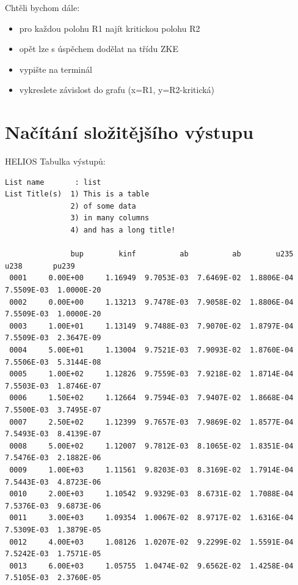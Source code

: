 \documentclass{beamer}
\begin{document}
\begin{frame}
  Chtěli bychom dále:
  \begin{itemize}
    \item pro každou polohu R1 najít kritickou polohu R2
    \item opět lze s úspěchem dodělat na třídu ZKE
    \item vypište na terminál
    \item vykreslete závislost do grafu (x=R1, y=R2-kritická)   
  \end{itemize}
\end{frame}


\section{Načítání složitějšího výstupu}

\begin{frame}[fragile]{HELIOS}
  Tabulka výstupů:
  \scriptsize
  \begin{verbatim}
List name       : list
List Title(s)  1) This is a table
               2) of some data
               3) in many columns
               4) and has a long title!

               bup        kinf          ab          ab        u235        u238       pu239
 0001     0.00E+00     1.16949  9.7053E-03  7.6469E-02  1.8806E-04  7.5509E-03  1.0000E-20
 0002     0.00E+00     1.13213  9.7478E-03  7.9058E-02  1.8806E-04  7.5509E-03  1.0000E-20
 0003     1.00E+01     1.13149  9.7488E-03  7.9070E-02  1.8797E-04  7.5509E-03  2.3647E-09
 0004     5.00E+01     1.13004  9.7521E-03  7.9093E-02  1.8760E-04  7.5506E-03  5.3144E-08
 0005     1.00E+02     1.12826  9.7559E-03  7.9218E-02  1.8714E-04  7.5503E-03  1.8746E-07
 0006     1.50E+02     1.12664  9.7594E-03  7.9407E-02  1.8668E-04  7.5500E-03  3.7495E-07
 0007     2.50E+02     1.12399  9.7657E-03  7.9869E-02  1.8577E-04  7.5493E-03  8.4139E-07
 0008     5.00E+02     1.12007  9.7812E-03  8.1065E-02  1.8351E-04  7.5476E-03  2.1882E-06
 0009     1.00E+03     1.11561  9.8203E-03  8.3169E-02  1.7914E-04  7.5443E-03  4.8723E-06
 0010     2.00E+03     1.10542  9.9329E-03  8.6731E-02  1.7088E-04  7.5376E-03  9.6873E-06
 0011     3.00E+03     1.09354  1.0067E-02  8.9717E-02  1.6316E-04  7.5309E-03  1.3879E-05
 0012     4.00E+03     1.08126  1.0207E-02  9.2299E-02  1.5591E-04  7.5242E-03  1.7571E-05
 0013     6.00E+03     1.05755  1.0474E-02  9.6562E-02  1.4258E-04  7.5105E-03  2.3760E-05
  \end{verbatim}
\end{frame}
\end{document}
